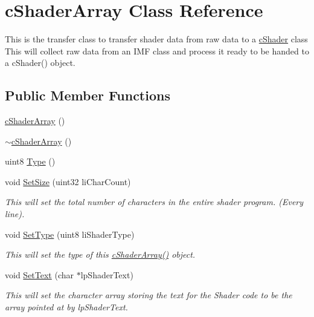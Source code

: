 \hypertarget{classc_shader_array}{
\section{cShaderArray Class Reference}
\label{classc_shader_array}
}


This is the transfer class to transfer shader data from raw data to a \hyperlink{classc_shader}{cShader} class This will collect raw data from an IMF class and process it ready to be handed to a cShader() object.  


\subsection*{Public Member Functions}
\begin{DoxyCompactItemize}
\item 
\hyperlink{classc_shader_array_a71aec9d0ce56bd411e8064f6f40b416e}{cShaderArray} ()
\item 
\hyperlink{classc_shader_array_abb536dac6716f4b0d283a450a8dac08b}{$\sim$cShaderArray} ()
\item 
uint8 \hyperlink{classc_shader_array_ae531fe3e05ad3ee39502baddf0a84353}{Type} ()
\item 
void \hyperlink{classc_shader_array_a2116af5d5d67735a438c520742b7e605}{SetSize} (uint32 liCharCount)
\begin{DoxyCompactList}\small\item\em This will set the total number of characters in the entire shader program. (Every line). \item\end{DoxyCompactList}\item 
void \hyperlink{classc_shader_array_a10438122d71b486eafbe76923e9480f7}{SetType} (uint8 liShaderType)
\begin{DoxyCompactList}\small\item\em This will set the type of this \hyperlink{classc_shader_array_a71aec9d0ce56bd411e8064f6f40b416e}{cShaderArray()} object. \item\end{DoxyCompactList}\item 
void \hyperlink{classc_shader_array_aac4feb822f0a07dceafc2f83ddfaddf2}{SetText} (char $\ast$lpShaderText)
\begin{DoxyCompactList}\small\item\em This will set the character array storing the text for the Shader code to be the array pointed at by lpShaderText. \item\end{DoxyCompactList}\item 

\end{DoxyCompactItemize}
